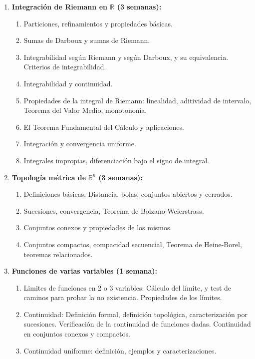 \begin{refsection}
\begin{enumerate}
\item \textbf{Integración de Riemann en $\mathbb{R}$ (3 semanas):} 
\begin{enumerate}
    \item Particiones, refinamientos y propiedades básicas.
    \item Sumas de Darboux y sumas de Riemann.
    \item Integrabilidad según Riemann y según Darboux, y su equivalencia. Criterios de integrabilidad.
    \item Integrabilidad y continuidad.
    \item Propiedades de la integral de Riemann: linealidad, aditividad de intervalo, Teorema del Valor Medio, monotononía. 
    \item El Teorema Fundamental del Cálculo y aplicaciones. 
    \item Integración y convergencia uniforme.
    \item Integrales impropias, diferenciación bajo el signo de integral.
\end{enumerate}

\item \textbf{Topología métrica de} $\mathbb{R}^n$ \textbf{(3 semanas):}
\begin{enumerate}
\item Definiciones b\'asicas: Distancia, bolas, conjuntos abiertos y cerrados.
\item Sucesiones, convergencia, Teorema de Bolzano-Weierstrass.
\item Conjuntos conexos y propiedades de los mismos.
\item Conjuntos compactos, compacidad secuencial, Teorema de Heine-Borel, teoremas relacionados.
\end{enumerate}

\item \textbf{Funciones de varias variables (1 semana):}
\begin{enumerate}
\item Limites de funciones en 2 o 3 variables: C\'alculo del l\'imite, y test de caminos para probar la no existencia. Propiedades de los límites.
\item Continuidad: Definición formal, definición topológica, caracterización por sucesiones.  Verificación de la continuidad de funciones dadas.  Continuidad en conjuntos conexos y compactos.
\item Continuidad uniforme: definición, ejemplos y caracterizaciones.
\end{enumerate}



\end{enumerate}
\end{refsection}
